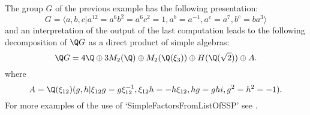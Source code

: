 The group $G$ of the previous example has the following presentation:
    $$G= \langle a,b,c|a^{12}=a^6b^2=a^6c^2=1,a^b=a^{-1},a^c=a^7,b^c=ba^3 \rangle$$
and an interpretation of the output of the last computation leads to the following 
decomposition of $\Q G$ as a direct product of simple algebras:
    $$\Q G = 4\Q \oplus 3M_2(\Q)\oplus M_2(\Q(\xi_3)) \oplus H(\Q(\sqrt{2})) \oplus A.$$
where
    $$A=\Q(\xi_{12})(g,h|\xi_{12}g=g\xi_{12}^{-1},\xi_{12}h=-h\xi_{12},hg=ghi,g^2=h^2=-1).$$
For more examples of the use of `SimpleFactorsFromListOfSSP' see 
\cite{OR}.

